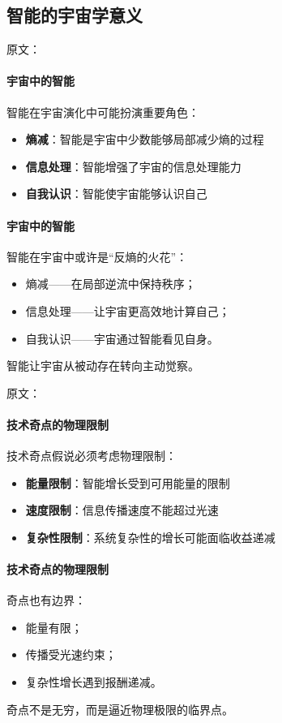 \subsection{智能的宇宙学意义}

原文：
\paragraph{宇宙中的智能}
智能在宇宙演化中可能扮演重要角色：
\begin{itemize}
\item \textbf{熵减}：智能是宇宙中少数能够局部减少熵的过程
\item \textbf{信息处理}：智能增强了宇宙的信息处理能力
\item \textbf{自我认识}：智能使宇宙能够认识自己
\end{itemize}
\paragraph{宇宙中的智能}
智能在宇宙中或许是“反熵的火花”：
\begin{itemize}
\item 熵减——在局部逆流中保持秩序；
\item 信息处理——让宇宙更高效地计算自己；
\item 自我认识——宇宙通过智能看见自身。
\end{itemize}
智能让宇宙从被动存在转向主动觉察。

原文：
\paragraph{技术奇点的物理限制}
技术奇点假说必须考虑物理限制：
\begin{itemize}
\item \textbf{能量限制}：智能增长受到可用能量的限制
\item \textbf{速度限制}：信息传播速度不能超过光速
\item \textbf{复杂性限制}：系统复杂性的增长可能面临收益递减
\end{itemize}
\paragraph{技术奇点的物理限制}
奇点也有边界：
\begin{itemize}
\item 能量有限；
\item 传播受光速约束；
\item 复杂性增长遇到报酬递减。
\end{itemize}
奇点不是无穷，而是逼近物理极限的临界点。

